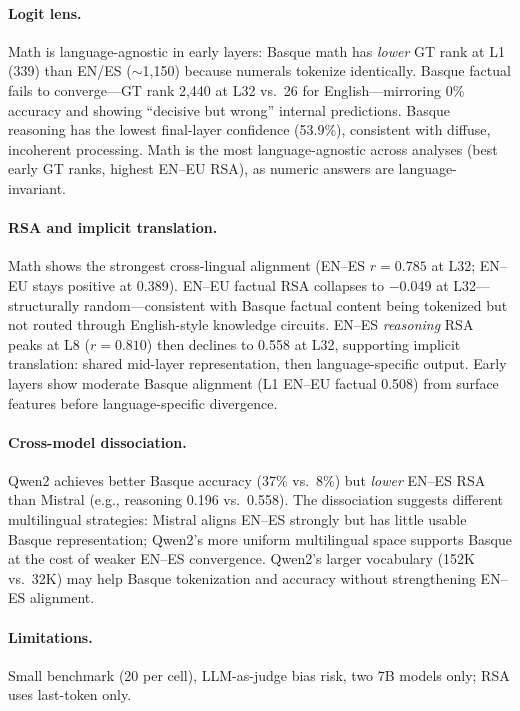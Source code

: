 \documentclass[10pt]{article}
\begin{document}
\paragraph{Logit lens.}
Math is language-agnostic in early layers: Basque math has \emph{lower} GT rank at L1 (339) than EN/ES ($\sim$1,150) because numerals tokenize identically. Basque factual fails to converge---GT rank 2,440 at L32 vs.\ 26 for English---mirroring 0\% accuracy and showing ``decisive but wrong'' internal predictions. Basque reasoning has the lowest final-layer confidence (53.9\%), consistent with diffuse, incoherent processing. Math is the most language-agnostic across analyses (best early GT ranks, highest EN--EU RSA), as numeric answers are language-invariant.

\paragraph{RSA and implicit translation.}
Math shows the strongest cross-lingual alignment (EN--ES $r = 0.785$ at L32; EN--EU stays positive at 0.389). EN--EU factual RSA collapses to $-$0.049 at L32---structurally random---consistent with Basque factual content being tokenized but not routed through English-style knowledge circuits. EN--ES \emph{reasoning} RSA peaks at L8 ($r = 0.810$) then declines to 0.558 at L32, supporting implicit translation: shared mid-layer representation, then language-specific output. Early layers show moderate Basque alignment (L1 EN--EU factual 0.508) from surface features before language-specific divergence.

\paragraph{Cross-model dissociation.}
Qwen2 achieves better Basque accuracy (37\% vs.\ 8\%) but \emph{lower} EN--ES RSA than Mistral (e.g., reasoning 0.196 vs.\ 0.558). The dissociation suggests different multilingual strategies: Mistral aligns EN--ES strongly but has little usable Basque representation; Qwen2's more uniform multilingual space supports Basque at the cost of weaker EN--ES convergence. Qwen2's larger vocabulary (152K vs.\ 32K) may help Basque tokenization and accuracy without strengthening EN--ES alignment.

\paragraph{Limitations.}
Small benchmark (20 per cell), LLM-as-judge bias risk, two 7B models only; RSA uses last-token only.
\end{document}

